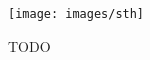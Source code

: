 \begin{figure}[h]
    \centering
    \texttt{[image: images/sth]}
    \caption{TODO}
    \label{fig:TODO}
\end{figure}

